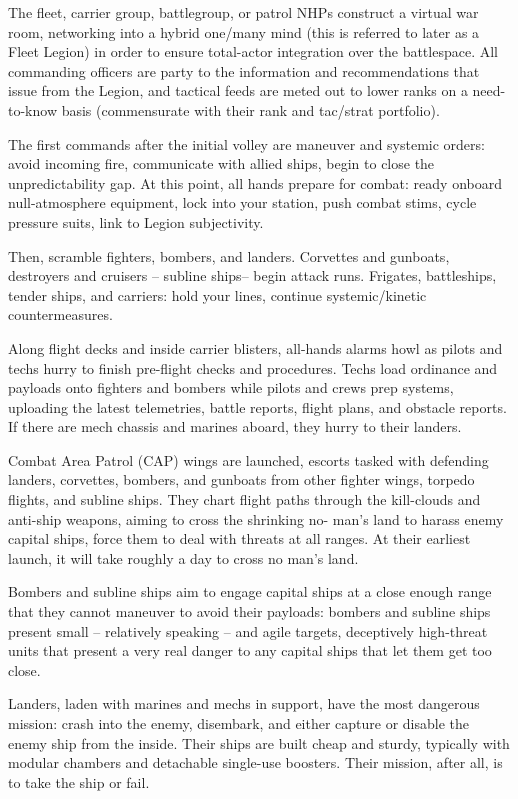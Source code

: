 The fleet, carrier group, battlegroup, or patrol NHPs construct a virtual war room, networking into
a hybrid one/many mind (this is referred to later as a Fleet Legion) in order to ensure total-actor
integration over the battlespace. All commanding officers are party to the information and
recommendations that issue from the Legion, and tactical feeds are meted out to lower ranks on
a need-to-know basis (commensurate with their rank and tac/strat portfolio).

The first commands after the initial volley are maneuver and systemic orders: avoid incoming fire,
communicate with allied ships, begin to close the unpredictability gap. At this point, all hands
prepare for combat: ready onboard null-atmosphere equipment, lock into your station, push
combat stims, cycle pressure suits, link to Legion subjectivity.

Then, scramble fighters, bombers, and landers. Corvettes and gunboats, destroyers and cruisers
-- subline ships-- begin attack runs. Frigates, battleships, tender ships, and carriers: hold your
lines, continue systemic/kinetic countermeasures.

Along flight decks and inside carrier blisters, all-hands alarms howl as pilots and techs hurry to
finish pre-flight checks and procedures. Techs load ordinance and payloads onto fighters and
bombers while pilots and crews prep systems, uploading the latest telemetries, battle reports,
flight plans, and obstacle reports. If there are mech chassis and marines aboard, they hurry to
their landers.

Combat Area Patrol (CAP) wings are launched, escorts tasked with defending landers, corvettes,
bombers, and gunboats from other fighter wings, torpedo flights, and subline ships. They chart
flight paths through the kill-clouds and anti-ship weapons, aiming to cross the shrinking no-
man’s land to harass enemy capital ships, force them to deal with threats at all ranges. At their
earliest launch, it will take roughly a day to cross no man’s land.

Bombers and subline ships aim to engage capital ships at a close enough range that they cannot
maneuver to avoid their payloads: bombers and subline ships present small -- relatively speaking
-- and agile targets, deceptively high-threat units that present a very real danger to any capital
ships that let them get too close.

Landers, laden with marines and mechs in support, have the most dangerous mission: crash into
the enemy, disembark, and either capture or disable the enemy ship from the inside. Their ships
are built cheap and sturdy, typically with modular chambers and detachable single-use boosters.
Their mission, after all, is to take the ship or fail.

